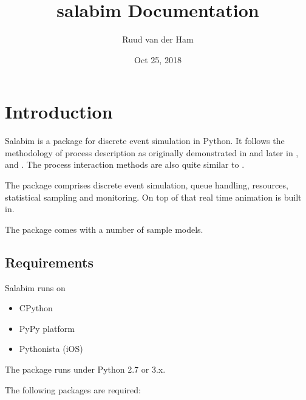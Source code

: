 \documentclass[letterpaper,10pt,english]{sphinxmanual}
\title{salabim Documentation}
\date{Oct 25, 2018}
\author{Ruud van der Ham}
\begin{document}
\maketitle
\sphinxtableofcontents
{}\label{\detokenize{index::doc}}



\chapter{Introduction}
\label{\detokenize{Introduction:introduction}}\label{\detokenize{Introduction::doc}}\label{\detokenize{Introduction:documentation-for-salabim}}
Salabim is a package for discrete event simulation in Python.
It follows the methodology of process description as originally demonstrated in 
and later in ,  and . 
The process interaction methods are also quite similar to .

The package comprises discrete event simulation, queue handling, resources, statistical sampling and monitoring.
On top of that real time animation is built in.

The package comes with a number of sample models.


\section{Requirements}
\label{\detokenize{Introduction:requirements}}
Salabim runs on
\begin{itemize}
\item {} 
CPython

\item {} 
PyPy platform

\item {} 
Pythonista (iOS)

\end{itemize}

The package runs under Python 2.7 or 3.x.

The following packages are required:
\end{document}
